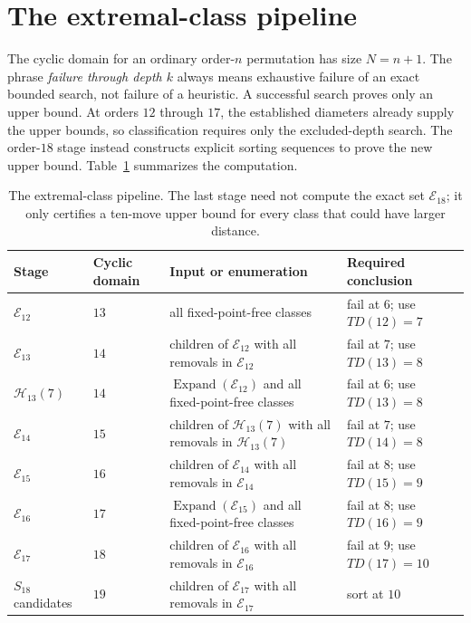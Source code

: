 \documentclass[11pt]{article}
\theoremstyle{definition}
\theoremstyle{remark}
\newcommand{\En}{\mathcal E}
\newcommand{\Hn}{\mathcal H}
\begin{document}
\section{The extremal-class pipeline}\label{sec:pipeline}

The cyclic domain for an ordinary order-$n$ permutation has size $N=n+1$.
The phrase \emph{failure through depth $k$} always means exhaustive failure
of an exact bounded search, not failure of a heuristic.  A successful search
proves only an upper bound.
At orders $12$ through $17$, the established diameters already supply the
upper bounds, so classification requires only the excluded-depth search.
The order-$18$ stage instead constructs explicit sorting sequences to prove
the new upper bound.
Table~\ref{tab:pipeline} summarizes the computation.

\begin{table}[ht]
\centering
\begin{tabularx}{\textwidth}{@{}ll
  >{\raggedright\arraybackslash}X
  >{\raggedright\arraybackslash}X@{}}
\toprule
Stage & Cyclic domain & Input or enumeration & Required conclusion \\
\midrule
$\En_{12}$ & $13$ & all fixed-point-free classes
  & fail at $6$; use $TD(12)=7$ \\
$\En_{13}$ & $14$ & children of $\En_{12}$ with all removals in $\En_{12}$
  & fail at $7$; use $TD(13)=8$ \\
$\Hn_{13}(7)$ & $14$ & $\operatorname{Expand}(\En_{12})$ and all
  fixed-point-free classes & fail at $6$; use $TD(13)=8$ \\
$\En_{14}$ & $15$ & children of $\Hn_{13}(7)$ with all removals in
  $\Hn_{13}(7)$ & fail at $7$; use $TD(14)=8$ \\
$\En_{15}$ & $16$ & children of $\En_{14}$ with all removals in $\En_{14}$
  & fail at $8$; use $TD(15)=9$ \\
$\En_{16}$ & $17$ & $\operatorname{Expand}(\En_{15})$ and all
  fixed-point-free classes & fail at $8$; use $TD(16)=9$ \\
$\En_{17}$ & $18$ & children of $\En_{16}$ with all removals in $\En_{16}$
  & fail at $9$; use $TD(17)=10$ \\
$S_{18}$ candidates & $19$ & children of $\En_{17}$ with all removals in
  $\En_{17}$ & sort at $10$ \\
\bottomrule
\end{tabularx}
\caption{The extremal-class pipeline.  The last stage need not compute the
exact set $\En_{18}$; it only certifies a ten-move upper bound for every class
that could have larger distance.}
\label{tab:pipeline}
\end{table}
\end{document}
